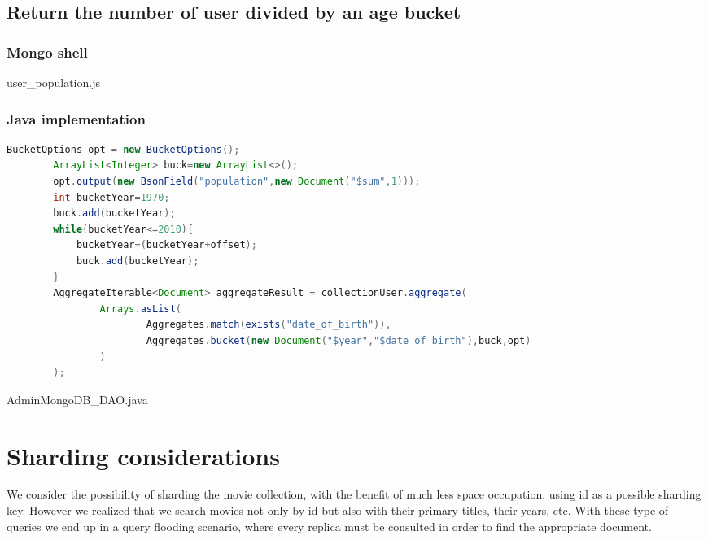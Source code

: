 \subsection{Return the number of user divided by an age bucket}\label{subsec:userPopulationBucket}
\subsubsection{Mongo shell}

\caption{user_population.js}
\subsubsection{Java implementation}
\begin{lstlisting}[language=Java]
BucketOptions opt = new BucketOptions();
        ArrayList<Integer> buck=new ArrayList<>();
        opt.output(new BsonField("population",new Document("$sum",1)));
        int bucketYear=1970;
        buck.add(bucketYear);
        while(bucketYear<=2010){
            bucketYear=(bucketYear+offset);
            buck.add(bucketYear);
        }
        AggregateIterable<Document> aggregateResult = collectionUser.aggregate(
                Arrays.asList(
                        Aggregates.match(exists("date_of_birth")),
                        Aggregates.bucket(new Document("$year","$date_of_birth"),buck,opt)
                )
        );
\end{lstlisting}
\caption{AdminMongoDB_DAO.java}

\section{Sharding considerations}
We consider the possibility of sharding the movie collection, with the benefit of much less space occupation, using id as a possible sharding key. However we realized that we search movies not only by id but also with their primary titles, their years, etc. With these type of queries we end up in a query flooding scenario, where every replica must be consulted in order to find the appropriate document.
